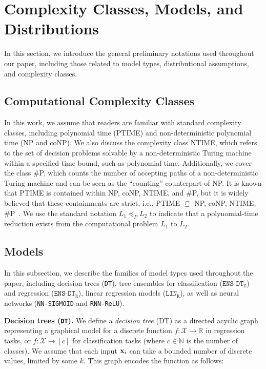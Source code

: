 \section{Complexity Classes, Models, and Distributions} \label{app:sec:terminology}

In this section, we introduce the general preliminary notations used throughout our paper, including those related to model types, distributional assumptions, and complexity classes.


\subsection{Computational Complexity Classes}

In this work, we assume that readers are familiar with standard complexity classes, including polynomial time (PTIME) and non-deterministic polynomial time (NP and coNP). We also discuss the complexity class NTIME, which refers to the set of decision problems solvable by a non-deterministic Turing machine within a specified time bound, such as polynomial time. Additionally, we cover the class $\#$P, which counts the number of accepting paths of a non-deterministic Turing machine and can be seen as the ``counting'' counterpart of NP. It is known that PTIME is contained within NP, coNP, NTIME, and $\#$P, but it is widely believed that these containments are strict, i.e., PTIME $\subsetneq$ NP, coNP, NTIME, $\#$P~\citep{arora2009computational}. We use the standard notation $L_1 \preceq_{P} L_2$ to indicate that a polynomial-time reduction exists from the computational problem $L_1$ to $L_2$.

\subsection{Models}

In this subsection, we describe the families of model types used throughout the paper, including decision trees (\texttt{DT}), tree ensembles for classification ($\texttt{ENS-DT}_{\texttt{C}}$) and regression ($\texttt{ENS-DT}_{\texttt{R}}$), linear regression models ($\texttt{LIN}_{\texttt{R}}$), as well as neural networks (\texttt{NN-SIGMOID} and \texttt{RNN-ReLU}).


\textbf{Decision trees (\texttt{DT}).} We define a \emph{decision tree} (DT) as a directed acyclic graph representing a graphical model for a discrete function $f: \mathcal{X} \to \mathbb{R}$ in regression tasks, or $f: \mathcal{X} \to [c]$ for classification tasks (where $c \in \mathbb{N}$ is the number of classes). We assume that each input $\textbf{x}_i$ can take a bounded number of discrete values, limited by some $k$. This graph encodes the function as follows:


